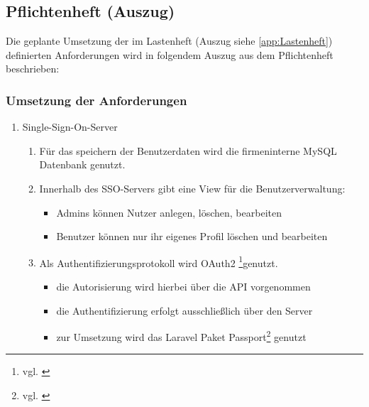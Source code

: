 \newpage
\subsection{Pflichtenheft (Auszug)}
\label{app:Pflichtenheft}

Die geplante Umsetzung der im Lastenheft (Auszug siehe \ref{app:Lastenheft}) definierten Anforderungen wird
in folgendem Auszug aus dem Pflichtenheft beschrieben:

\subsubsection*{Umsetzung der Anforderungen}

\begin{enumerate}[itemsep=0em,partopsep=0em,parsep=0em,topsep=0em]

\item Single-Sign-On-Server
	\begin{enumerate}
		\item Für das speichern der Benutzerdaten wird die firmeninterne MySQL Datenbank genutzt. 
		\item Innerhalb des \acs{SSO-Servers} gibt eine View für die Benutzerverwaltung:	
		\begin{itemize}
			\item Admins können Nutzer anlegen, löschen, bearbeiten
			\item Benutzer können nur ihr eigenes Profil löschen und bearbeiten
		\end{itemize}
	\item Als Authentifizierungsprotokoll wird OAuth2 \footnote{vgl. \cite{OAuth2}}genutzt.
	\begin{itemize}
		\item die Autorisierung wird hierbei über die API vorgenommen
		\item die Authentifizierung erfolgt ausschließlich über den Server
		\item zur Umsetzung wird das Laravel Paket Passport\footnote{vgl. \cite{Passport}} genutzt
	\end{itemize}
	\end{enumerate}


\end{enumerate}
